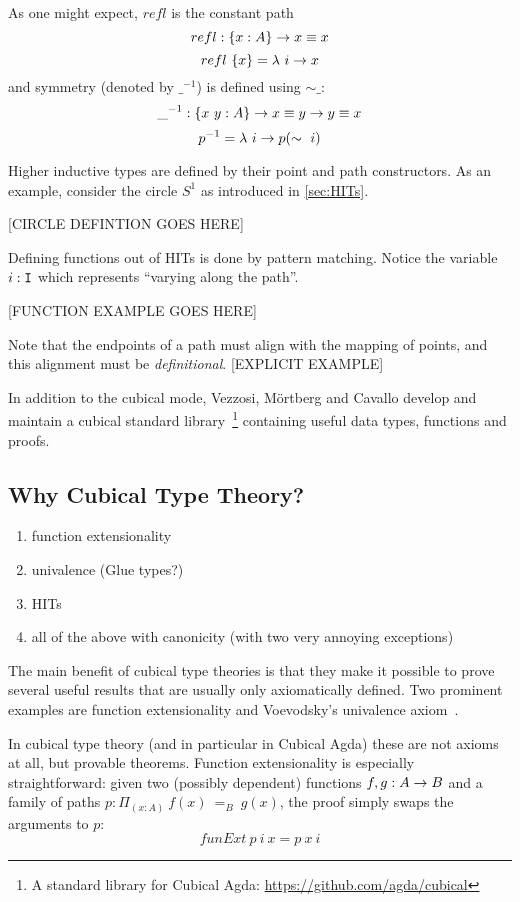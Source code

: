 As one might expect, $refl$ is the constant path
\[
  refl : \{x : A\} \rightarrow x \equiv x
\] \[
  refl~\{x\} = \lambda~i \rightarrow x
\]
and symmetry (denoted by $\_^{-1}$) is defined using $\sim\_$:
\[
  \_^{-1} : \{x~y : A\} \rightarrow x \equiv y \rightarrow y \equiv x
\] \[
  p^{-1} = \lambda~i \rightarrow p(\sim~i)
\]

Higher inductive types are defined by their point and path constructors. As an
example, consider the circle $S^1$ as introduced in \autoref{sec:HITs}.

[CIRCLE DEFINTION GOES HERE]

Defining functions out of HITs is done by pattern matching. Notice the variable
$i:\texttt{I}$ which represents ``varying along the path''.

[FUNCTION EXAMPLE GOES HERE]

Note that the endpoints of a path must align with the mapping of points, and
this alignment must be \emph{definitional}. [EXPLICIT EXAMPLE]

In addition to the cubical mode, Vezzosi, M\"ortberg and Cavallo develop and
maintain a cubical standard library~\footnote[1]{A standard library for Cubical
  Agda: \url{https://github.com/agda/cubical}} containing useful data types,
functions and proofs.

\subsection{Why Cubical Type Theory?}
\begin{enumerate}
  \item function extensionality
  \item univalence (Glue types?)
  \item HITs
  \item all of the above with canonicity (with two very annoying exceptions)
\end{enumerate}

The main benefit of cubical type theories is that they make it possible to prove
several useful results that are usually only axiomatically defined. Two
prominent examples are function extensionality and Voevodsky's univalence
axiom~\cite{voevodsky2014}.

In cubical type theory (and in particular in Cubical Agda) these are not axioms
at all, but provable theorems. Function extensionality is especially
straightforward: given two (possibly dependent) functions $f,g : A \rightarrow B$ and a
family of paths $p : \Pi_{(x:A)}~f(x)~=_B~g(x)$, the proof simply swaps the
arguments to $p$:
\[funExt~p~i~x = p~x~i\]

